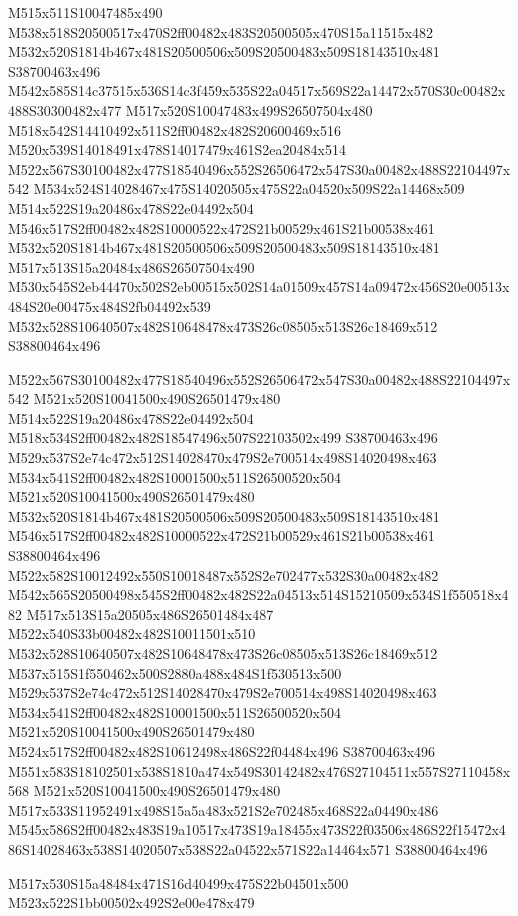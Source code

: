 \documentclass{article}
\begin{document}
\begin{multicols}{2}
M515x511S10047485x490 M538x518S20500517x470S2ff00482x483S20500505x470S15a11515x482 M532x520S1814b467x481S20500506x509S20500483x509S18143510x481 S38700463x496 M542x585S14c37515x536S14c3f459x535S22a04517x569S22a14472x570S30c00482x488S30300482x477 M517x520S10047483x499S26507504x480 M518x542S14410492x511S2ff00482x482S20600469x516 M520x539S14018491x478S14017479x461S2ea20484x514 M522x567S30100482x477S18540496x552S26506472x547S30a00482x488S22104497x542 M534x524S14028467x475S14020505x475S22a04520x509S22a14468x509 M514x522S19a20486x478S22e04492x504 M546x517S2ff00482x482S10000522x472S21b00529x461S21b00538x461 M532x520S1814b467x481S20500506x509S20500483x509S18143510x481 M517x513S15a20484x486S26507504x490 M530x545S2eb44470x502S2eb00515x502S14a01509x457S14a09472x456S20e00513x484S20e00475x484S2fb04492x539 M532x528S10640507x482S10648478x473S26c08505x513S26c18469x512 S38800464x496

M522x567S30100482x477S18540496x552S26506472x547S30a00482x488S22104497x542 M521x520S10041500x490S26501479x480 M514x522S19a20486x478S22e04492x504 M518x534S2ff00482x482S18547496x507S22103502x499 S38700463x496 M529x537S2e74c472x512S14028470x479S2e700514x498S14020498x463 M534x541S2ff00482x482S10001500x511S26500520x504 M521x520S10041500x490S26501479x480 M532x520S1814b467x481S20500506x509S20500483x509S18143510x481 M546x517S2ff00482x482S10000522x472S21b00529x461S21b00538x461 S38800464x496 M522x582S10012492x550S10018487x552S2e702477x532S30a00482x482 M542x565S20500498x545S2ff00482x482S22a04513x514S15210509x534S1f550518x482 M517x513S15a20505x486S26501484x487 M522x540S33b00482x482S10011501x510 M532x528S10640507x482S10648478x473S26c08505x513S26c18469x512 M537x515S1f550462x500S2880a488x484S1f530513x500 M529x537S2e74c472x512S14028470x479S2e700514x498S14020498x463 M534x541S2ff00482x482S10001500x511S26500520x504 M521x520S10041500x490S26501479x480 M524x517S2ff00482x482S10612498x486S22f04484x496 S38700463x496 M551x583S18102501x538S1810a474x549S30142482x476S27104511x557S27110458x568 M521x520S10041500x490S26501479x480 M517x533S11952491x498S15a5a483x521S2e702485x468S22a04490x486 M545x586S2ff00482x483S19a10517x473S19a18455x473S22f03506x486S22f15472x486S14028463x538S14020507x538S22a04522x571S22a14464x571 S38800464x496

\begin{center}
M517x530S15a48484x471S16d40499x475S22b04501x500 M523x522S1bb00502x492S2e00e478x479 
\end{center}



\end{multicols}
\end{document}
